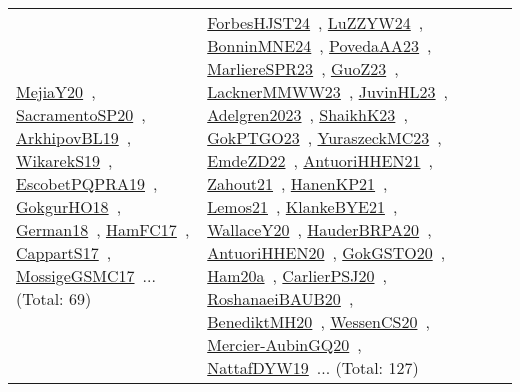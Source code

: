{\begin{longtable}{lp{3cm}>{\raggedright\arraybackslash}p{6cm}>{\raggedright\arraybackslash}p{6cm}>{\raggedright\arraybackslash}p{8cm}}
\href{../works/MejiaY20.pdf}{MejiaY20}~\cite{MejiaY20}, \href{../works/SacramentoSP20.pdf}{SacramentoSP20}~\cite{SacramentoSP20}, \href{../works/ArkhipovBL19.pdf}{ArkhipovBL19}~\cite{ArkhipovBL19}, \href{../works/WikarekS19.pdf}{WikarekS19}~\cite{WikarekS19}, \href{../works/EscobetPQPRA19.pdf}{EscobetPQPRA19}~\cite{EscobetPQPRA19}, \href{../works/GokgurHO18.pdf}{GokgurHO18}~\cite{GokgurHO18}, \href{../works/German18.pdf}{German18}~\cite{German18}, \href{../works/HamFC17.pdf}{HamFC17}~\cite{HamFC17}, \href{../works/CappartS17.pdf}{CappartS17}~\cite{CappartS17}, \href{../works/MossigeGSMC17.pdf}{MossigeGSMC17}~\cite{MossigeGSMC17}... (Total: 69) & \href{../works/ForbesHJST24.pdf}{ForbesHJST24}~\cite{ForbesHJST24}, \href{../works/LuZZYW24.pdf}{LuZZYW24}~\cite{LuZZYW24}, \href{../works/BonninMNE24.pdf}{BonninMNE24}~\cite{BonninMNE24}, \href{../works/PovedaAA23.pdf}{PovedaAA23}~\cite{PovedaAA23}, \href{../works/MarliereSPR23.pdf}{MarliereSPR23}~\cite{MarliereSPR23}, \href{../works/GuoZ23.pdf}{GuoZ23}~\cite{GuoZ23}, \href{../works/LacknerMMWW23.pdf}{LacknerMMWW23}~\cite{LacknerMMWW23}, \href{../works/JuvinHL23.pdf}{JuvinHL23}~\cite{JuvinHL23}, \href{../works/Adelgren2023.pdf}{Adelgren2023}~\cite{Adelgren2023}, \href{../works/ShaikhK23.pdf}{ShaikhK23}~\cite{ShaikhK23}, \href{../works/GokPTGO23.pdf}{GokPTGO23}~\cite{GokPTGO23}, \href{../works/YuraszeckMC23.pdf}{YuraszeckMC23}~\cite{YuraszeckMC23}, \href{../works/EmdeZD22.pdf}{EmdeZD22}~\cite{EmdeZD22}, \href{../works/AntuoriHHEN21.pdf}{AntuoriHHEN21}~\cite{AntuoriHHEN21}, \href{../works/Zahout21.pdf}{Zahout21}~\cite{Zahout21}, \href{../works/HanenKP21.pdf}{HanenKP21}~\cite{HanenKP21}, \href{../works/Lemos21.pdf}{Lemos21}~\cite{Lemos21}, \href{../works/KlankeBYE21.pdf}{KlankeBYE21}~\cite{KlankeBYE21}, \href{../works/WallaceY20.pdf}{WallaceY20}~\cite{WallaceY20}, \href{../works/HauderBRPA20.pdf}{HauderBRPA20}~\cite{HauderBRPA20}, \href{../works/AntuoriHHEN20.pdf}{AntuoriHHEN20}~\cite{AntuoriHHEN20}, \href{../works/GokGSTO20.pdf}{GokGSTO20}~\cite{GokGSTO20}, \href{../works/Ham20a.pdf}{Ham20a}~\cite{Ham20a}, \href{../works/CarlierPSJ20.pdf}{CarlierPSJ20}~\cite{CarlierPSJ20}, \href{../works/RoshanaeiBAUB20.pdf}{RoshanaeiBAUB20}~\cite{RoshanaeiBAUB20}, \href{../works/BenediktMH20.pdf}{BenediktMH20}~\cite{BenediktMH20}, \href{../works/WessenCS20.pdf}{WessenCS20}~\cite{WessenCS20}, \href{../works/Mercier-AubinGQ20.pdf}{Mercier-AubinGQ20}~\cite{Mercier-AubinGQ20}, \href{../works/NattafDYW19.pdf}{NattafDYW19}~\cite{NattafDYW19}... (Total: 127)\\

\end{longtable}}
